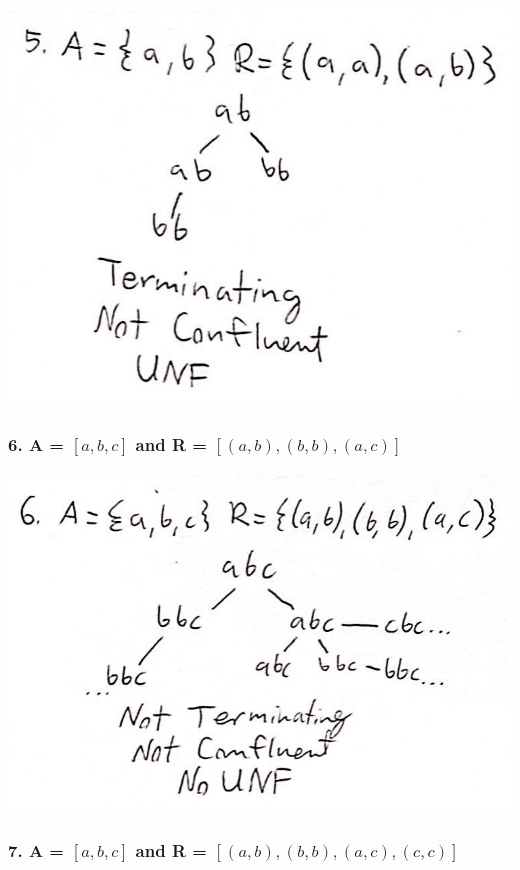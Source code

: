 \documentclass{article}
\theoremstyle{theorem}
\theoremstyle{definition}
\theoremstyle{remark}
\begin{document}
      \begin{center}
        \includegraphics*[scale=0.2]{ars5.jpg}
        \end{center}

  \subsubsection*{6. A = $\left[a,b,c\right]$ and R = $\left[(a,b),(b,b),(a,c)\right]$}

        \begin{center}
          \includegraphics*[scale=0.2]{ars6.jpg}
          \end{center}

  \subsubsection*{7. A = $\left[a,b,c\right]$ and R = $\left[(a,b),(b,b),(a,c),(c,c)\right]$}
\end{document}
